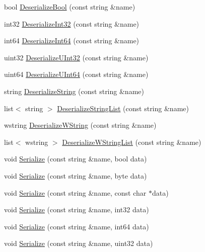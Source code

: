 \begin{DoxyCompactItemize}
\item 
bool \hyperlink{class_gost_crypt_1_1_serializer_af393b082b53d0e44b2f53be8e02f68ba}{Deserialize\+Bool} (const string \&name)
\item 
int32 \hyperlink{class_gost_crypt_1_1_serializer_a5fb6eca3b3bbee7d5cb540a02b156ca9}{Deserialize\+Int32} (const string \&name)
\item 
int64 \hyperlink{class_gost_crypt_1_1_serializer_afc8c758b68227ecc0b2abc8f8fb7d52d}{Deserialize\+Int64} (const string \&name)
\item 
uint32 \hyperlink{class_gost_crypt_1_1_serializer_ac030398e0f4887da331e91cdcf2e2b67}{Deserialize\+U\+Int32} (const string \&name)
\item 
uint64 \hyperlink{class_gost_crypt_1_1_serializer_aa4bc43dbf0915ddc8ca806893f2fe75c}{Deserialize\+U\+Int64} (const string \&name)
\item 
string \hyperlink{class_gost_crypt_1_1_serializer_afc4e689cfaf89809fd729c1ec2a8ec8a}{Deserialize\+String} (const string \&name)
\item 
list$<$ string $>$ \hyperlink{class_gost_crypt_1_1_serializer_a9d973fc5d0ef82706491ca37e1946cba}{Deserialize\+String\+List} (const string \&name)
\item 
wstring \hyperlink{class_gost_crypt_1_1_serializer_ac31f5f6d18736800e791e843c1612a8b}{Deserialize\+W\+String} (const string \&name)
\item 
list$<$ wstring $>$ \hyperlink{class_gost_crypt_1_1_serializer_a049d056397f5c2f02a09b42c98f35251}{Deserialize\+W\+String\+List} (const string \&name)
\item 
void \hyperlink{class_gost_crypt_1_1_serializer_aad94f636ca751f12da1efd4926e11453}{Serialize} (const string \&name, bool data)
\item 
void \hyperlink{class_gost_crypt_1_1_serializer_a4913dcd27fd1ff0bab1fc7a84938eb32}{Serialize} (const string \&name, byte data)
\item 
void \hyperlink{class_gost_crypt_1_1_serializer_a3bc0ceb13740ba682396219ceeacaafa}{Serialize} (const string \&name, const char $\ast$data)
\item 
void \hyperlink{class_gost_crypt_1_1_serializer_ae0274addc1f3176bf8ac2a382fd57393}{Serialize} (const string \&name, int32 data)
\item 
void \hyperlink{class_gost_crypt_1_1_serializer_ad59b2f3805503d210a1bbeac852d1728}{Serialize} (const string \&name, int64 data)
\item 
void \hyperlink{class_gost_crypt_1_1_serializer_a4f426a758f8270c2141a905c385ce02c}{Serialize} (const string \&name, uint32 data)

\end{DoxyCompactItemize}
